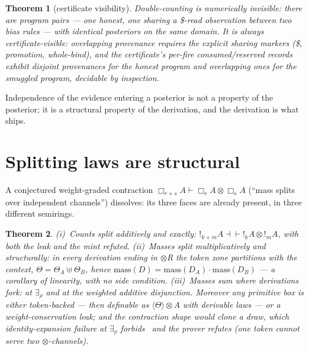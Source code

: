 \documentclass[11pt]{article}
\newcommand{\tensor}{\otimes}
\newcommand{\trz}[1]{\langle #1\rangle}
\newcommand{\Tr}{\Theta}
\newtheorem{theorem}{Theorem}[section]
\theoremstyle{definition}
\theoremstyle{remark}
\begin{document}
\begin{theorem}[certificate visibility]
\label{thm:visibility}
Double-counting is numerically invisible: there are program pairs ---
one honest, one sharing a \$-read observation between two bias rules
--- with \emph{identical} posteriors on the same domain.  It is always
certificate-visible: overlapping provenance requires the explicit
sharing markers (\$, promotion, whole-bind), and the certificate's
per-fire consumed/reserved records exhibit disjoint provenances for the
honest program and overlapping ones for the smuggled program, decidable
by inspection.
\end{theorem}

Independence of the evidence entering a posterior is not a property of
the posterior; it is a structural property of the derivation, and the
derivation is what ships.

\section{Splitting laws are structural}
\label{sec:splitting}

A conjectured weight-graded contraction
$\Box_{r+s}A \vdash \Box_r A \tensor \Box_s A$ (``mass splits over
independent channels'') dissolves: its three faces are already present,
in three different semirings.

\begin{theorem}
\label{thm:splitting}
(i)~Counts split additively and exactly: $!_{k+m}A \dashv\vdash
{!_k}A \tensor {!_m}A$, with both the leak and the mint refuted.
(ii)~Masses split multiplicatively and \emph{structurally}: in every
derivation ending in $\tensor$R the token zone partitions with the
context, $\Tr = \Tr_A \uplus \Tr_B$, hence
$\mathrm{mass}(D)=\mathrm{mass}(D_A)\cdot \mathrm{mass}(D_B)$ --- a
corollary of linearity, with no side condition.  (iii)~Masses sum
where derivations fork: at $\exists_\rho$ and at the weighted additive
disjunction.  Moreover any primitive box is either token-backed ---
then definable as $\trz{\Tr}\tensor A$ with derivable laws --- or a
weight-conservation leak; and the contraction shape would clone a
draw, which identity-expansion failure at $\exists_\rho$
forbids~\cite{WillPaper} and the prover refutes (one token cannot
serve two $\tensor$-channels).
\end{theorem}
\end{document}
